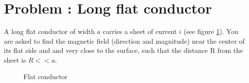 \documentclass[problems]{esg8022pset}
\date{\today }
\begin{document}
\section{Problem \thesection: Long flat conductor}
A long flat conductor of width $a$ carries a sheet of current $i$ (see figure \ref{fig:flat}). You are asked to find the magnetic  field (direction and magnitude) near the center of
its flat side and and very close to the surface, such that the distance R from the sheet is $R<<a$.

      \begin{figure}[ht]
       \begin{center}
        \caption{Flat conductor}
        \end{center}
        \label{fig:flat}
      \end{figure}
\end{document}
